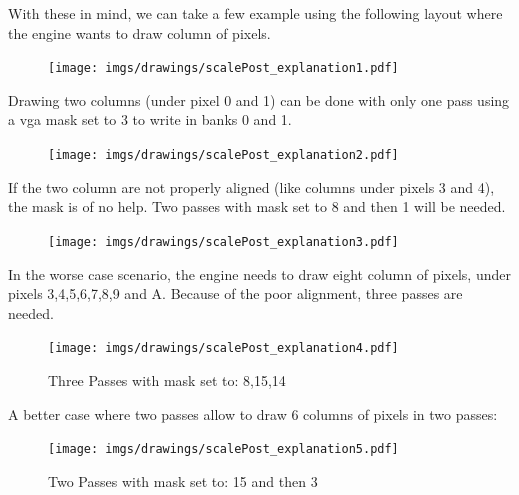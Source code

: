 With these in mind, we can take a few example using the following layout where the engine wants to draw column of pixels.
\begin{figure}[H]
\centering
 \texttt{[image: imgs/drawings/scalePost\_explanation1.pdf]}
 \end{figure}


 Drawing two columns (under pixel 0 and 1) can be done with only one pass using a vga mask set to 3 to write in banks 0 and 1.\\
 \par
 \begin{minipage}{\textwidth}

\end{minipage}
\par

 \begin{figure}[H]
 \centering
 \texttt{[image: imgs/drawings/scalePost\_explanation2.pdf]}
 \end{figure}





If the two column are not properly aligned (like columns under pixels 3 and 4), the mask is of no help. Two passes with mask set to 8 and then 1 will be needed.\\
 \par
 \begin{minipage}{\textwidth}

\end{minipage}
\par
  \begin{figure}[H]
 \centering
 \texttt{[image: imgs/drawings/scalePost\_explanation3.pdf]}
 \end{figure}


In the worse case scenario, the engine needs to draw eight column of pixels, under pixels 3,4,5,6,7,8,9 and A. Because of the poor alignment, three passes are needed.\\
 \par
 \begin{minipage}{\textwidth}

\end{minipage}
\par
  \begin{figure}[H]
 \centering
 \texttt{[image: imgs/drawings/scalePost\_explanation4.pdf]}
 \caption{Three Passes with mask set to: 8,15,14}
 \end{figure}


A better case where two passes allow to draw 6 columns of pixels in two passes:\\
 \par
 \begin{minipage}{\textwidth}

\end{minipage}
\par
   \begin{figure}[H]
 \centering
 \texttt{[image: imgs/drawings/scalePost\_explanation5.pdf]}
  \caption{Two Passes with mask set to: 15 and then 3}
 \end{figure}







